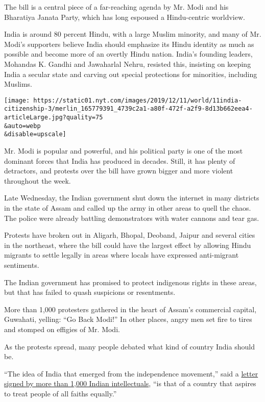 The bill is a central piece of a far-reaching agenda by Mr. Modi and his
Bharatiya Janata Party, which has long espoused a Hindu-centric
worldview.

India is around 80 percent Hindu, with a large Muslim minority, and many
of Mr. Modi's supporters believe India should emphasize its Hindu
identity as much as possible and become more of an overtly Hindu nation.
India's founding leaders, Mohandas K. Gandhi and Jawaharlal Nehru,
resisted this, insisting on keeping India a secular state and carving
out special protections for minorities, including Muslims.

\texttt{[image: https://static01.nyt.com/images/2019/12/11/world/11india-citizenship-3/merlin\_165779391\_4739c2a1-a80f-472f-a2f9-8d13b662eea4-articleLarge.jpg?quality=75\\\&auto=webp\\\&disable=upscale]}

Mr. Modi is popular and powerful, and his political party is one of the
most dominant forces that India has produced in decades. Still, it has
plenty of detractors, and protests over the bill have grown bigger and
more violent throughout the week.

Late Wednesday, the Indian government shut down the internet in many
districts in the state of Assam and called up the army in other areas to
quell the chaos. The police were already battling demonstrators with
water cannons and tear gas.

Protests have broken out in Aligarh, Bhopal, Deoband, Jaipur and several
cities in the northeast, where the bill could have the largest effect by
allowing Hindu migrants to settle legally in areas where locals have
expressed anti-migrant sentiments.

The Indian government has promised to protect indigenous rights in these
areas, but that has failed to quash suspicions or resentments.

More than 1,000 protesters gathered in the heart of Assam's commercial
capital, Guwahati, yelling: ``Go Back Modi!'' In other places, angry men
set fire to tires and stomped on effigies of Mr. Modi.

As the protests spread, many people debated what kind of country India
should be.

``The idea of India that emerged from the independence movement,'' said
a
\href{https://docs.google.com/document/d/1dmuimPt4jESfWqqdz361N4aQu0Je0tiuoy0yp9nVp4w/edit}{letter
signed by more than 1,000 Indian intellectuals}, ``is that of a country
that aspires to treat people of all faiths equally.''

